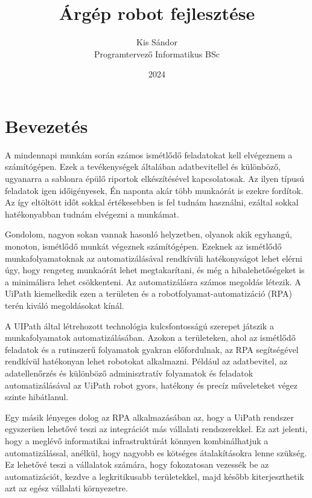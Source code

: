 \documentclass[
]{thesis-ekf}
\theoremstyle{definition}
\theoremstyle{remark}
\begin{document}
\title{Árgép robot fejlesztése}
\author{Kis Sándor\\Programtervező Informatikus BSc}
\date{2024}
\maketitle
\tableofcontents

\chapter*{Bevezetés}
A mindennapi munkám során számos ismétlődő feladatokat kell elvégeznem a számítógépen. Ezek a tevékenységek általában adatbevitellel és különböző, ugyanarra a sablonra épülő riportok elkészítésével kapcsolatosak. Az ilyen típusú feladatok igen időigényesek, Én naponta akár több munkaórát is ezekre fordítok. Az így eltöltött időt sokkal értékesebben is fel tudnám használni, ezáltal sokkal hatékonyabban tudnám elvégezni a munkámat.

Gondolom, nagyon sokan vannak hasonló helyzetben, olyanok akik egyhangú, monoton, ismétlődő munkát végeznek számítógépen. Ezeknek az ismétlődő munkafolyamatoknak az automatizálásával rendkívüli hatékonyságot lehet elérni úgy, hogy rengeteg munkaórát lehet megtakarítani, és még a hibalehetőségeket is a minimálisra lehet csökkenteni. Az automatizálásra számos megoldás létezik. A UiPath kiemelkedik ezen a területen és a robotfolyamat-automatizáció (RPA) terén kiváló megoldásokat kínál.

A UIPath által létrehozott technológia kulcsfontosságú szerepet játszik a munkafolyamatok automatizálásában. Azokon a területeken, ahol az ismétlődő feladatok és a rutinszerű folyamatok gyakran előfordulnak, az RPA segítségével rendkívül hatékonyan lehet robotokat alkalmazni. Például az adatbevitel, az adatellenőrzés és különböző adminisztratív folyamatok és feladatok automatizálásával az UiPath robot gyors, hatékony és precíz műveleteket végez szinte hibátlanul.

Egy másik lényeges dolog az RPA alkalmazásában az, hogy a UiPath rendszer egyszerüen lehetővé teszi az integrációt más vállalati rendszerekkel. Ez azt jelenti, hogy a meglévő informatikai infrastruktúrát könnyen kombinálhatjuk a automatizálással, anélkül, hogy nagyobb es kötséges átalakításokra lenne szükség. Ez lehetővé teszi a vállalatok számára, hogy fokozatosan vezessék be az automatizációt, kezdve a legkritikusabb területekkel, majd később kiterjeszthetik azt az egész vállalati környezetre.
\end{document}
